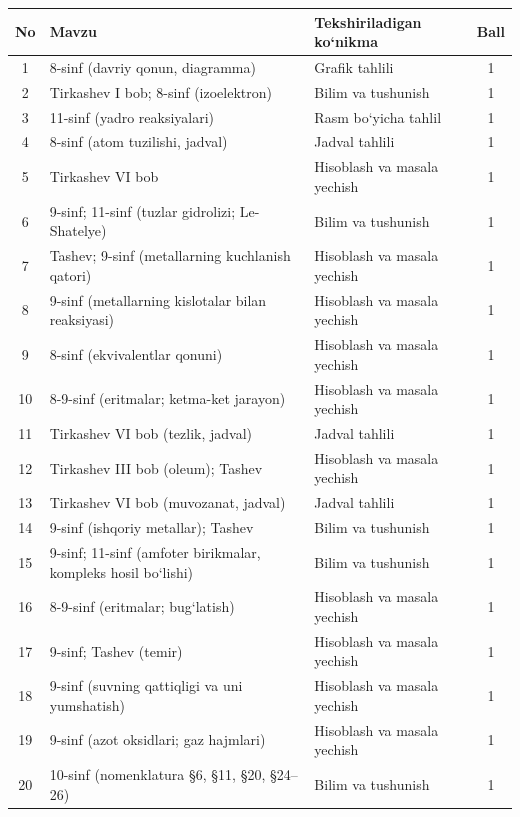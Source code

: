 \documentclass[11pt,a4paper]{article}
\begin{document}
{\small\noindent\begin{longtable}{|c|p{7.2cm}|p{5.4cm}|c|}\hline \textbf{No} & \textbf{Mavzu} & \textbf{Tekshiriladigan ko`nikma} & \textbf{Ball}\\\hline
1 & 8-sinf (davriy qonun, diagramma) & Grafik tahlili & 1\\\hline
2 & Tirkashev I bob; 8-sinf (izoelektron) & Bilim va tushunish & 1\\\hline
3 & 11-sinf (yadro reaksiyalari) & Rasm bo`yicha tahlil & 1\\\hline
4 & 8-sinf (atom tuzilishi, jadval) & Jadval tahlili & 1\\\hline
5 & Tirkashev VI bob & Hisoblash va masala yechish & 1\\\hline
6 & 9-sinf; 11-sinf (tuzlar gidrolizi; Le-Shatelye) & Bilim va tushunish & 1\\\hline
7 & Tashev; 9-sinf (metallarning kuchlanish qatori) & Hisoblash va masala yechish & 1\\\hline
8 & 9-sinf (metallarning kislotalar bilan reaksiyasi) & Hisoblash va masala yechish & 1\\\hline
9 & 8-sinf (ekvivalentlar qonuni) & Hisoblash va masala yechish & 1\\\hline
10 & 8-9-sinf (eritmalar; ketma-ket jarayon) & Hisoblash va masala yechish & 1\\\hline
11 & Tirkashev VI bob (tezlik, jadval) & Jadval tahlili & 1\\\hline
12 & Tirkashev III bob (oleum); Tashev & Hisoblash va masala yechish & 1\\\hline
13 & Tirkashev VI bob (muvozanat, jadval) & Jadval tahlili & 1\\\hline
14 & 9-sinf (ishqoriy metallar); Tashev & Bilim va tushunish & 1\\\hline
15 & 9-sinf; 11-sinf (amfoter birikmalar, kompleks hosil bo`lishi) & Bilim va tushunish & 1\\\hline
16 & 8-9-sinf (eritmalar; bug`latish) & Hisoblash va masala yechish & 1\\\hline
17 & 9-sinf; Tashev (temir) & Hisoblash va masala yechish & 1\\\hline
18 & 9-sinf (suvning qattiqligi va uni yumshatish) & Hisoblash va masala yechish & 1\\\hline
19 & 9-sinf (azot oksidlari; gaz hajmlari) & Hisoblash va masala yechish & 1\\\hline
20 & 10-sinf (nomenklatura \S{}6, \S{}11, \S{}20, \S{}24--26) & Bilim va tushunish & 1\\\hline

\end{longtable}}
\end{document}
